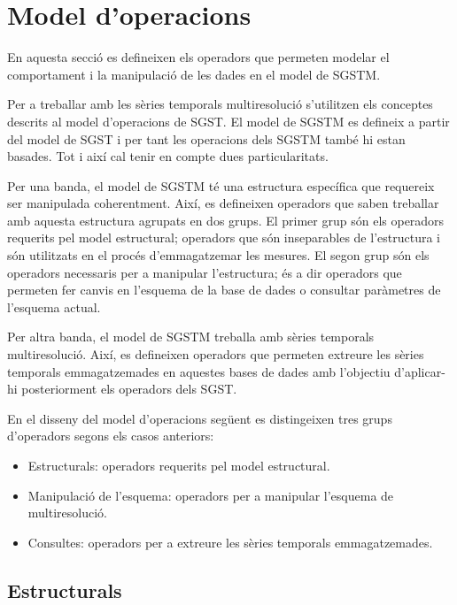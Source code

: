 \section{Model d'operacions}

En aquesta secció es defineixen els operadors que permeten modelar el
comportament i la manipulació de les dades en el model de SGSTM.

Per a treballar amb les sèries temporals multiresolució s'utilitzen
els conceptes descrits al model d'operacions de SGST. El model de
SGSTM es defineix a partir del model de SGST i per tant les operacions
dels SGSTM també hi estan basades. Tot i així cal tenir en compte dues
particularitats.

Per una banda, el model de SGSTM té una estructura específica que
requereix ser manipulada coherentment. Així, es defineixen operadors
que saben treballar amb aquesta estructura agrupats en dos grups.  El
primer grup són els operadors requerits pel model estructural;
operadors que són inseparables de l'estructura i són utilitzats en el
procés d'emmagatzemar les mesures. El segon grup són els operadors
necessaris per a manipular l'estructura; és a dir operadors que
permeten fer canvis en l'esquema de la base de dades o consultar
paràmetres de l'esquema actual.

Per altra banda, el model de SGSTM treballa amb sèries temporals
multiresolució. Així, es defineixen operadors que permeten extreure
les sèries temporals emmagatzemades en aquestes bases de dades amb
l'objectiu d'aplicar-hi posteriorment els operadors dels SGST.


En el disseny del model d'operacions següent es distingeixen tres
grups d'operadors segons els casos anteriors:

\begin{itemize}
\item Estructurals: operadors requerits pel model estructural.
\item Manipulació de l'esquema: operadors per a manipular l'esquema de
  multiresolució.
\item Consultes: operadors per a extreure les sèries temporals
  emmagatzemades.
\end{itemize}





\subsection{Estructurals}
\label{sec:model:sgstm-estructurals}

